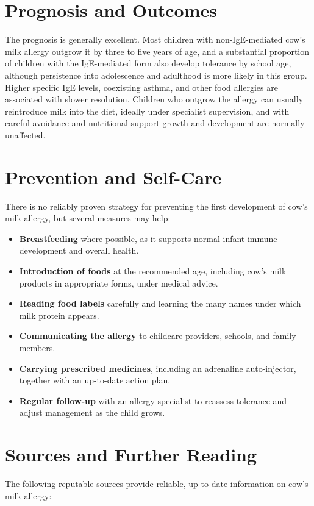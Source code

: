 \section*{Prognosis and Outcomes}
The prognosis is generally excellent. Most children with non-IgE-mediated cow's milk allergy outgrow it by three to five years of age, and a substantial proportion of children with the IgE-mediated form also develop tolerance by school age, although persistence into adolescence and adulthood is more likely in this group. Higher specific IgE levels, coexisting asthma, and other food allergies are associated with slower resolution. Children who outgrow the allergy can usually reintroduce milk into the diet, ideally under specialist supervision, and with careful avoidance and nutritional support growth and development are normally unaffected.

\section*{Prevention and Self-Care}
There is no reliably proven strategy for preventing the first development of cow's milk allergy, but several measures may help:

\begin{itemize}
    \item \textbf{Breastfeeding} where possible, as it supports normal infant immune development and overall health.
    \item \textbf{Introduction of foods} at the recommended age, including cow's milk products in appropriate forms, under medical advice.
    \item \textbf{Reading food labels} carefully and learning the many names under which milk protein appears.
    \item \textbf{Communicating the allergy} to childcare providers, schools, and family members.
    \item \textbf{Carrying prescribed medicines}, including an adrenaline auto-injector, together with an up-to-date action plan.
    \item \textbf{Regular follow-up} with an allergy specialist to reassess tolerance and adjust management as the child grows.
\end{itemize}

\section*{Sources and Further Reading}
The following reputable sources provide reliable, up-to-date information on cow's milk allergy:

